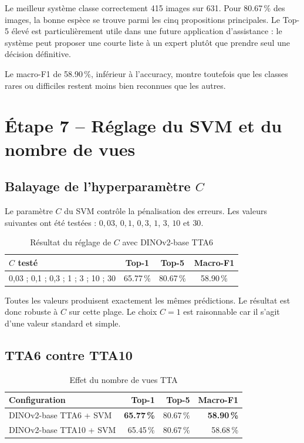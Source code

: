 \documentclass[12pt,a4paper]{report}
\newcommand{\pct}[1]{\num{#1}\,\%}
\begin{document}
Le meilleur système classe correctement 415 images sur 631. Pour \pct{80,67} des images, la bonne espèce se trouve parmi les cinq propositions principales. Le Top-5 élevé est particulièrement utile dans une future application d'assistance : le système peut proposer une courte liste à un expert plutôt que prendre seul une décision définitive.

Le macro-F1 de \pct{58,90}, inférieur à l'accuracy, montre toutefois que les classes rares ou difficiles restent moins bien reconnues que les autres.

\chapter{Étape 7 -- Réglage du SVM et du nombre de vues}

\section{Balayage de l'hyperparamètre \texorpdfstring{$C$}{C}}

Le paramètre $C$ du SVM contrôle la pénalisation des erreurs. Les valeurs suivantes ont été testées : $0{,}03$, $0{,}1$, $0{,}3$, $1$, $3$, $10$ et $30$.

\begin{table}[H]
\centering
\caption{Résultat du réglage de $C$ avec DINOv2-base TTA6}
\begin{tabular}{lccc}
\toprule
\textbf{$C$ testé} & \textbf{Top-1} & \textbf{Top-5} & \textbf{Macro-F1}\\
\midrule
0,03 ; 0,1 ; 0,3 ; 1 ; 3 ; 10 ; 30 & \pct{65,77} & \pct{80,67} & \pct{58,90}\\
\bottomrule
\end{tabular}
\end{table}

Toutes les valeurs produisent exactement les mêmes prédictions. Le résultat est donc robuste à $C$ sur cette plage. Le choix $C=1$ est raisonnable car il s'agit d'une valeur standard et simple.

\section{TTA6 contre TTA10}

\begin{table}[H]
\centering
\caption{Effet du nombre de vues TTA}
\begin{tabular}{lrrr}
\toprule
\textbf{Configuration} & \textbf{Top-1} & \textbf{Top-5} & \textbf{Macro-F1}\\
\midrule
DINOv2-base TTA6 + SVM & \textbf{\pct{65,77}} & \pct{80,67} & \textbf{\pct{58,90}}\\
DINOv2-base TTA10 + SVM & \pct{65,45} & \pct{80,67} & \pct{58,68}\\
\bottomrule
\end{tabular}
\end{table}
\end{document}
